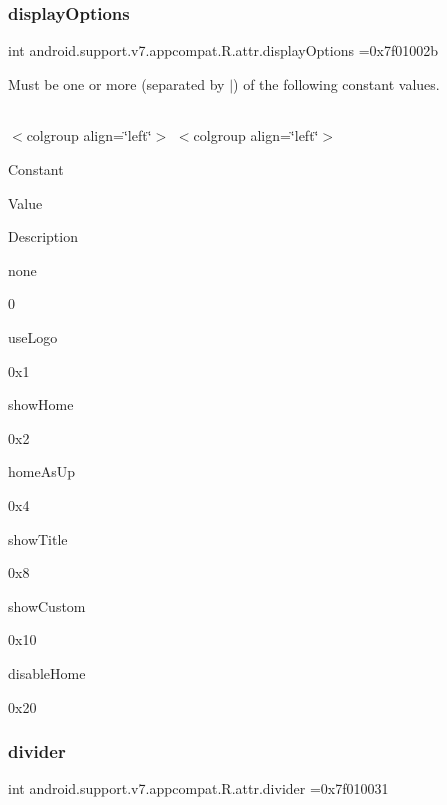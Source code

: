 \subsubsection{\texorpdfstring{display\+Options}{displayOptions}}
{\footnotesize\ttfamily int android.\+support.\+v7.\+appcompat.\+R.\+attr.\+display\+Options =0x7f01002b\hspace{0.3cm}{\ttfamily [static]}}

Must be one or more (separated by \textquotesingle{}$\vert$\textquotesingle{}) of the following constant values.

\tabulinesep=1mm
\begin{longtabu} spread 0pt [c]{*{0}{|X[-1]}|}
\hline
\end{longtabu}
$<$colgroup align=\char`\"{}left\char`\"{}$>$ $<$colgroup align=\char`\"{}left\char`\"{}$>$ 

Constant

Value

Description 

{\ttfamily none}

0

{\ttfamily use\+Logo}

0x1

{\ttfamily show\+Home}

0x2

{\ttfamily home\+As\+Up}

0x4

{\ttfamily show\+Title}

0x8

{\ttfamily show\+Custom}

0x10

{\ttfamily disable\+Home}

0x20\mbox{\label{classandroid_1_1support_1_1v7_1_1appcompat_1_1R_1_1attr_a8f75111bd93530bdbf366ffa149e524f}} 
\subsubsection{\texorpdfstring{divider}{divider}}
{\footnotesize\ttfamily int android.\+support.\+v7.\+appcompat.\+R.\+attr.\+divider =0x7f010031\hspace{0.3cm}{\ttfamily [static]}}

